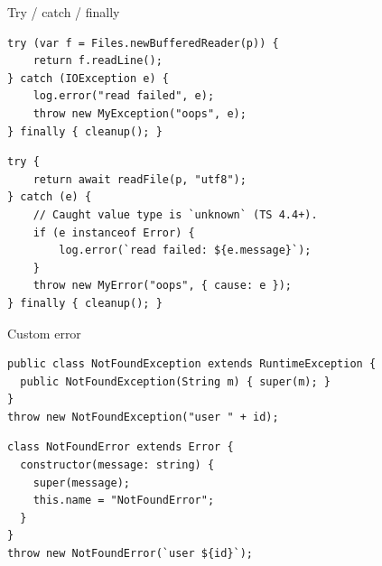 \documentclass[10pt]{article}
\begin{document}
\begin{construct}{Try / catch / finally}
\noindent
\begin{minipage}[t]{0.485\linewidth}
\begin{lstlisting}[style=java, title=Java]
try (var f = Files.newBufferedReader(p)) {
    return f.readLine();
} catch (IOException e) {
    log.error("read failed", e);
    throw new MyException("oops", e);
} finally { cleanup(); }
\end{lstlisting}
\end{minipage}\hfill
\begin{minipage}[t]{0.485\linewidth}
\begin{lstlisting}[style=ts, title=TypeScript]
try {
    return await readFile(p, "utf8");
} catch (e) {
    // Caught value type is `unknown` (TS 4.4+).
    if (e instanceof Error) {
        log.error(`read failed: ${e.message}`);
    }
    throw new MyError("oops", { cause: e });
} finally { cleanup(); }
\end{lstlisting}
\end{minipage}
\end{construct}

\begin{construct}{Custom error}
\noindent
\begin{minipage}[t]{0.485\linewidth}
\begin{lstlisting}[style=java, title=Java]
public class NotFoundException extends RuntimeException {
  public NotFoundException(String m) { super(m); }
}
throw new NotFoundException("user " + id);
\end{lstlisting}
\end{minipage}\hfill
\begin{minipage}[t]{0.485\linewidth}
\begin{lstlisting}[style=ts, title=TypeScript]
class NotFoundError extends Error {
  constructor(message: string) {
    super(message);
    this.name = "NotFoundError";
  }
}
throw new NotFoundError(`user ${id}`);
\end{lstlisting}
\end{minipage}
\end{construct}

\end{document}
